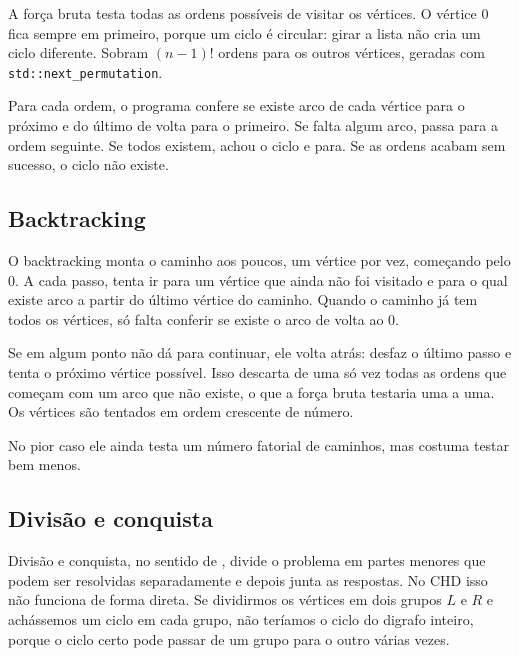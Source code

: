 \documentclass[12pt,a4paper]{article}
\begin{document}
A força bruta testa todas as ordens possíveis de visitar os vértices. O vértice $0$ fica sempre em primeiro, porque um ciclo é circular: girar a lista não cria um ciclo diferente. Sobram $(n-1)!$ ordens para os outros vértices, geradas com \texttt{std::next\_permutation}.

Para cada ordem, o programa confere se existe arco de cada vértice para o próximo e do último de volta para o primeiro. Se falta algum arco, passa para a ordem seguinte. Se todos existem, achou o ciclo e para. Se as ordens acabam sem sucesso, o ciclo não existe.




\subsection{Backtracking}

O backtracking monta o caminho aos poucos, um vértice por vez, começando pelo $0$. A cada passo, tenta ir para um vértice que ainda não foi visitado e para o qual existe arco a partir do último vértice do caminho. Quando o caminho já tem todos os vértices, só falta conferir se existe o arco de volta ao $0$.

Se em algum ponto não dá para continuar, ele volta atrás: desfaz o último passo e tenta o próximo vértice possível. Isso descarta de uma só vez todas as ordens que começam com um arco que não existe, o que a força bruta testaria uma a uma. Os vértices são tentados em ordem crescente de número.

No pior caso ele ainda testa um número fatorial de caminhos, mas costuma testar bem menos.




\subsection{Divisão e conquista}
\label{sec:dc}

Divisão e conquista, no sentido de \cite{cormen2009}, divide o problema em partes menores que podem ser resolvidas separadamente e depois junta as respostas. No CHD isso não funciona de forma direta. Se dividirmos os vértices em dois grupos $L$ e $R$ e achássemos um ciclo em cada grupo, não teríamos o ciclo do digrafo inteiro, porque o ciclo certo pode passar de um grupo para o outro várias vezes.
\end{document}
